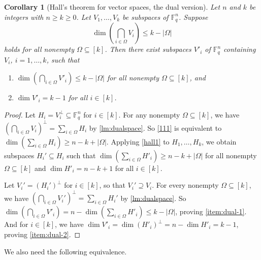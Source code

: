 \documentclass[11pt]{article}
\theoremstyle{plain}
\newtheorem{cor}[thm]{Corollary}
\theoremstyle{definition}
\theoremstyle{remark}
\newcommand{\F}{\mathbb{F}}
\begin{document}
\begin{cor}[Hall’s theorem for vector spaces, the dual version]\label{halldual1}
Let $n$ and $k$ be integers with $n\ge k\geq 0$. Let $V_1,\dots,V_k$ be subspaces of $\F_q^n$. 
Suppose
\begin{equation}\label{111}
\dim \left(\bigcap_{i\in \Omega}V_i\right)\leq k-|\Omega|
\end{equation}
holds for all nonempty $\Omega\subseteq [k]$. Then there exist subspaces $V'_i$ of $\F_q^n$ containing $V_i$, $i=1,\dots,k$, such that
\begin{enumerate}
\item \label{item:dual-1} $\dim \left(\bigcap_{i\in\Omega}V'_i\right)\leq k-|\Omega|$ for all nonempty $\Omega\subseteq [k]$, and
\item \label{item:dual-2} $\dim V'_i=k-1$ for all $i\in[k]$.
\end{enumerate}
\end{cor}
\begin{proof}
Let $H_i=V_i^{\perp}\subseteq\F_q^n$ for $i\in [k]$.
For any nonempty $\Omega\subseteq [k]$, we have
$\left(\bigcap_{i\in \Omega}V_i\right)^{\perp}=\sum_{i\in \Omega}H_i$ by \cref{lm:dualspace}.
So \eqref{111} is equivalent to $\dim\left(\sum_{i\in \Omega}H_i\right)\geq n-k+|\Omega|$. 
Applying \cref{hall1} to $H_1,\dots,H_k$, we obtain subspaces $H_i'\subseteq H_i$ such that 
$\dim\left(\sum_{i\in\Omega}H'_i\right)\geq n-k+|\Omega|$ for all nonempty $\Omega\subseteq [k]$ and $\dim H'_i=n-k+1$ for all $i\in[k]$.

Let $V_i'=(H_i')^{\perp}$ for $i\in [k]$, so that $V_i'\supseteq V_i$.
For every nonempty $\Omega\subseteq [k]$, we have 
$\left(\bigcap_{i\in \Omega}V_i'\right)^{\perp}=\sum_{i\in \Omega}H_i'$ by \cref{lm:dualspace}. So $\dim \left(\bigcap_{i\in\Omega}V'_i\right)=n-\dim \left(\sum_{i\in\Omega}H'_i\right) \leq k-|\Omega|$, proving \cref{item:dual-1}.
And for $i\in [k]$, we have $\dim V'_i=\dim (H'_i)^{\perp}=n-\dim H'_i=k-1$, proving \cref{item:dual-2}.
\end{proof}

We also need the following equivalence.
\end{document}
